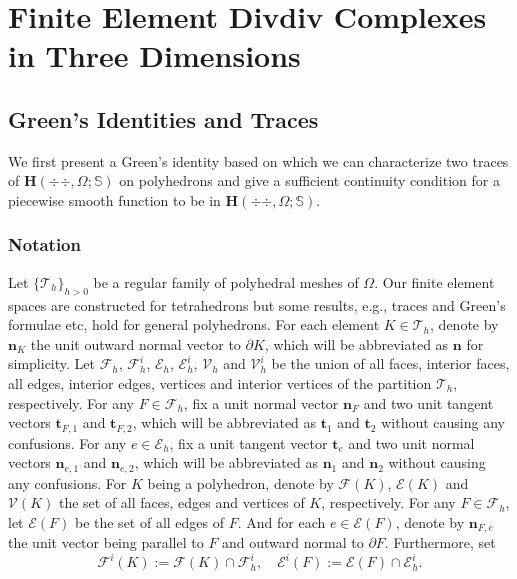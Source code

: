 \chapter{Finite Element Divdiv Complexes in Three Dimensions}



\section{Green's Identities and Traces}\label{sec:greentrace}
We first present a Green's identity based on which we can characterize two traces of $ \boldsymbol{H}(\div\div, \Omega; \mathbb{S}) $ on polyhedrons and give a sufficient continuity condition for a piecewise smooth function to be in $ \boldsymbol{H}(\div\div, \Omega; \mathbb{S}) $. 

\subsection{Notation}
Let $\{\mathcal {T}_h\}_{h>0}$ be a regular family of polyhedral meshes
of $\Omega$. Our finite element spaces are constructed for tetrahedrons but some results, e.g., traces and Green's formulae etc, hold for general polyhedrons.   For each element $K\in\mathcal{T}_h$, denote by $\boldsymbol{n}_K $ the
unit outward normal vector to $\partial K$,  which will be abbreviated as $\boldsymbol{n}$ for simplicity.
Let $\mathcal{F}_h$, $\mathcal{F}^i_h$, $\mathcal{E}_h$, $\mathcal{E}^i_h$, $\mathcal{V}_h$ and $\mathcal{V}^i_h$ be the union of all faces, interior faces, all edges, interior edges, vertices and interior vertices
of the partition $\mathcal {T}_h$, respectively.
For any $F\in\mathcal{F}_h$,
fix a unit normal vector $\boldsymbol{n}_F$ and two unit tangent vectors $\boldsymbol{t}_{F,1}$ and $\boldsymbol{t}_{F,2}$, which will be abbreviated as $\boldsymbol{t}_{1}$ and $\boldsymbol{t}_{2}$ without causing any confusions.
For any $e\in\mathcal{E}_h$,
fix a unit tangent vector $\boldsymbol{t}_e$ and two unit normal vectors $\boldsymbol{n}_{e,1}$ and $\boldsymbol{n}_{e,2}$, which will be abbreviated as $\boldsymbol{n}_{1}$ and $\boldsymbol{n}_{2}$ without causing any confusions.
For $K$ being a polyhedron, denote by $\mathcal{F}(K)$, $\mathcal{E}(K)$ and $\mathcal{V}(K)$ the set of all faces, edges and vertices of $K$, respectively. 
For any $F\in\mathcal{F}_h$, let $\mathcal{E}(F)$ be the set of all edges of $F$. And for each $e\in\mathcal{E}(F)$, denote by $\boldsymbol n_{F,e}$ the unit vector
being parallel to $F$ and outward normal to $\partial F$.
Furthermore, set
\[
\mathcal{F}^i(K):=\mathcal{F}(K)\cap\mathcal{F}^i_h, \quad\mathcal{E}^i(F):=\mathcal{E}(F)\cap\mathcal{E}^i_h. %
\]

